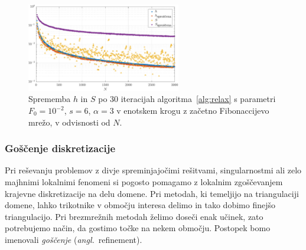 \documentclass[12pt,a4paper,twoside]{article}
\theoremstyle{definition} %
\theoremstyle{plain} %
\numberwithin{equation}{section}
\newcommand{\ang}[1]{(\hspace{-1.5px}\textit{angl.}\ #1)}
\begin{document}
\begin{figure}[!ht]
  \vspace{-1ex}
  \centering
  \includegraphics[width=0.6\textwidth]{images/relax_improvement.pdf}
  \vspace{-2ex}
  \caption[Sprememba kvalitete diskretizacije po izboljšavi.]{Sprememba $h$ in
    $S$ po 30 iteracijah algoritma~\ref{alg:relax} s parametri $F_0 = 10^{-2}$,
    $s = 6$, $\alpha = 3$ v enotskem krogu z začetno
    Fibonaccijevo mrežo, v odvisnosti od $N$.}
  \label{fig:relax-hs}
  \vspace{-5ex}
\end{figure}

\subsubsection{Goščenje diskretizacije}
\label{sec:goscenje}
Pri reševanju problemov z divje spreminjajočimi rešitvami, singularnostmi ali zelo majhnimi
lokalnimi fenomeni si pogosto pomagamo z lokalnim zgoščevanjem krajevne diskretizacije na delu
domene. Pri metodah, ki temeljijo na triangulaciji domene, lahko
trikotnike v območju interesa delimo in tako dobimo finejšo triangulacijo. Pri brezmrežnih
metodah želimo doseči enak učinek, zato potrebujemo način, da gostimo točke na nekem območju.
Postopek bomo imenovali \emph{goščenje} \ang{refinement}.
\end{document}
